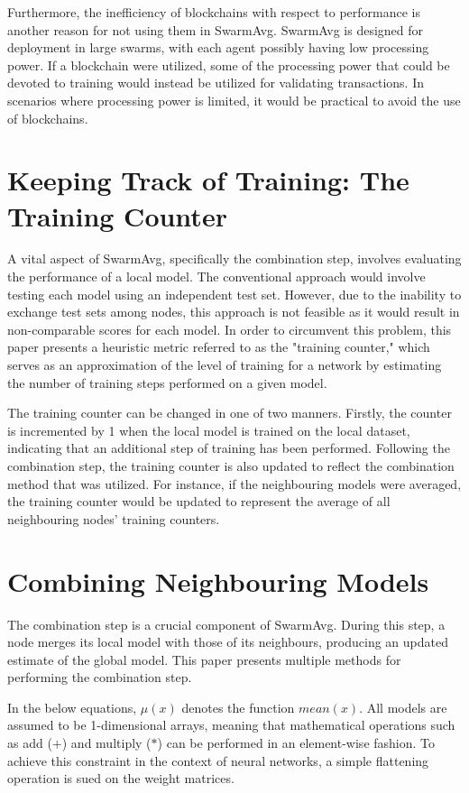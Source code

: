 Furthermore, the inefficiency of blockchains with respect to performance is another reason for not using them in SwarmAvg. SwarmAvg is designed for deployment in large swarms, with each agent possibly having low processing power. If a blockchain were utilized, some of the processing power that could be devoted to training would instead be utilized for validating transactions. In scenarios where processing power is limited, it would be practical to avoid the use of blockchains.

\section{Keeping Track of Training: The Training Counter}
A vital aspect of SwarmAvg, specifically the combination step, involves evaluating the performance of a local model. The conventional approach would involve testing each model using an independent test set. However, due to the inability to exchange test sets among nodes, this approach is not feasible as it would result in non-comparable scores for each model. In order to circumvent this problem, this paper presents a heuristic metric referred to as the "training counter," which serves as an approximation of the level of training for a network by estimating the number of training steps performed on a given model.

The training counter can be changed in one of two manners. Firstly, the counter is incremented by 1 when the local model is trained on the local dataset, indicating that an additional step of training has been performed. Following the combination step, the training counter is also updated to reflect the combination method that was utilized. For instance, if the neighbouring models were averaged, the training counter would be updated to represent the average of all neighbouring nodes' training counters.

\section{Combining Neighbouring Models} \label{mcm}
The combination step is a crucial component of SwarmAvg. During this step, a node merges its local model with those of its neighbours, producing an updated estimate of the global model. This paper presents multiple methods for performing the combination step.

In the below equations, $\mu(x)$ denotes the function $mean(x)$. All models are assumed to be 1-dimensional arrays, meaning that mathematical operations such as add ($+$) and multiply ($*$) can be performed in an element-wise fashion. To achieve this constraint in the context of neural networks, a simple flattening operation is sued on the weight matrices.

